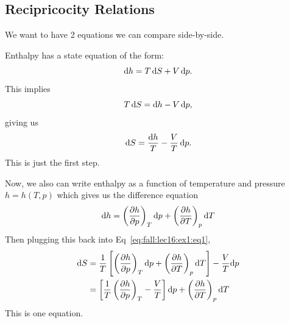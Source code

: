 
\lecture{}

\subsection{Recipricocity Relations}

\begin{node}
We want to have 2 equations we can compare side-by-side.
\end{node}

\begin{example}
Enthalpy has a state equation of the form:
\begin{equation}
\mathrm{d} h = T\,\mathrm{d} S + V\,\mathrm{d} p.
\end{equation}
This implies
\begin{equation}
T\,\mathrm{d} S = \mathrm{d} h - V\,\mathrm{d} p,
\end{equation}
giving us
\begin{equation}\label{eq:fall:lec16:ex1:eq1}
\mathrm{d} S = \frac{\mathrm{d} h}{T}-\frac{V}{T}\,\mathrm{d} p.
\end{equation}
This is just the first step.

Now, we also can write enthalpy as a function of temperature and
pressure $h=h(T,p)$ which gives us the difference equation
\begin{equation}
\mathrm{d} h = \left(\frac{\partial h}{\partial p}\right)_{T}\mathrm{d} p
+ \left(\frac{\partial h}{\partial T}\right)_{p}\mathrm{d} T
\end{equation}
Then plugging this back into Eq~\eqref{eq:fall:lec16:ex1:eq1},
\begin{subequations}\label{eq:fall:lec16:ex1:eq3}
  \begin{align}
\mathrm{d} S &= \frac{1}{T}\left[\left(\frac{\partial h}{\partial p}\right)_{T}\mathrm{d} p
+ \left(\frac{\partial h}{\partial T}\right)_{p}\mathrm{d} T\right]-\frac{V}{T}\mathrm{d} p\\
&=\left[\frac{1}{T}\left(\frac{\partial h}{\partial p}\right)_{T}
 -\frac{V}{T} \right]\mathrm{d} p + \left(\frac{\partial h}{\partial T}\right)_{p}\mathrm{d} T
  \end{align}
\end{subequations}
This is one equation.


\end{example}
